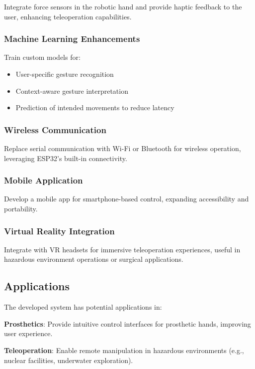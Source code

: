 \documentclass[12pt]{article}
\begin{document}
Integrate force sensors in the robotic hand and provide haptic feedback to the user, enhancing teleoperation capabilities.

\subsubsection{Machine Learning Enhancements}

Train custom models for:
\begin{itemize}
    \item User-specific gesture recognition
    \item Context-aware gesture interpretation
    \item Prediction of intended movements to reduce latency
\end{itemize}

\subsubsection{Wireless Communication}

Replace serial communication with Wi-Fi or Bluetooth for wireless operation, leveraging ESP32's built-in connectivity.

\subsubsection{Mobile Application}

Develop a mobile app for smartphone-based control, expanding accessibility and portability.

\subsubsection{Virtual Reality Integration}

Integrate with VR headsets for immersive teleoperation experiences, useful in hazardous environment operations or surgical applications.

\subsection{Applications}

The developed system has potential applications in:

\textbf{Prosthetics}: Provide intuitive control interfaces for prosthetic hands, improving user experience.

\textbf{Teleoperation}: Enable remote manipulation in hazardous environments (e.g., nuclear facilities, underwater exploration).
\end{document}
